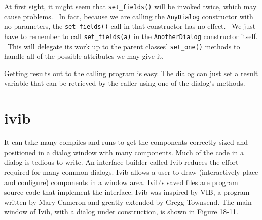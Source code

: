 
At first sight, it might seem that \texttt{set\_fields()} will be
invoked twice, which may cause problems. \ In fact, because we are
calling the \texttt{AnyDialog} constructor with no parameters, the
\texttt{set\_fields()} call in that constructor has no effect. \ We
just have to remember to call \texttt{set\_fields(a)} in the
\texttt{AnotherDialog} constructor itself. \ This will delegate its
work up to the parent classes' \texttt{set\_one()}
methods to handle all of the possible attributes we may give it.

Getting results out to the calling program is easy. The dialog
can just set a result variable that can be retrieved by
the caller using one of the dialog's methods.

\section{\textsf{ivib}}

It can
take many compiles and runs to get the components
correctly sized and positioned
in a dialog window with many components. Much of the code in a
dialog is tedious to write.
An
interface builder called Ivib
reduces the effort required for many common dialogs.
Ivib allows a user to draw (interactively place and configure)
components in a window area. Ivib's saved files are program source code
that implement the interface. Ivib was inspired by VIB, a program
written by Mary Cameron and greatly extended by
Gregg Townsend. The main window of Ivib, with a
dialog under construction, is shown in Figure 18-11.

